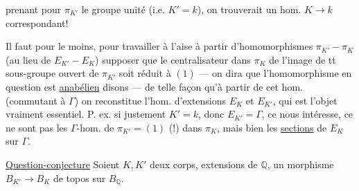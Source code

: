 prenant pour $\pi_{K'}$ le groupe unité (i.e. $K'=k$), on trouverait un hom. $K\longrightarrow k$ correspondant!

Il faut pour le moins, pour travailler à l'aise à partir d'homomorphismes $\pi_{K'}-\pi_K$ (au lieu de $E_{K'}-E_K$) supposer que le centralisateur dans $\pi_K$ de l'image de tt sous-groupe ouvert de $\pi_{K'}$ soit réduit à $(1)$ --- on dira que l'homomorphisme en question est \uline{anabélien} disons --- de telle façon qu'à partir de cet hom. (commutant à $\Gamma$) on reconstitue l'hom. d'extensions $E_K$ et $E_{K'}$, qui est l'objet vraiment essentiel. P. ex. si justement $K'=k$, donc $E_{K'}=\Gamma$, ce  nous intéresse, ce ne sont pas les $\Gamma$-hom. de $\pi_{K'}=(1)$ (!) dans $\pi_K$, mais bien les \uline{sections} de $E_K$ sur $\Gamma$.

\uline{Question-conjecture} Soient $K,K'$ deux corps, extensions   de $\mathbb Q$,   un morphisme $B_{K'}\longrightarrow B_K$ de topos sur $B_{\mathbb Q}$.
